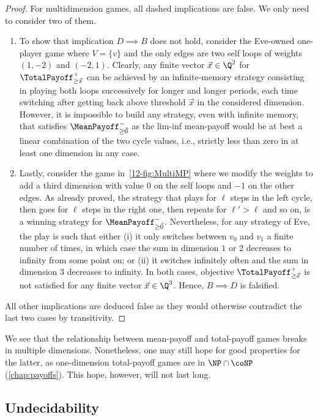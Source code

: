 \begin{proof}
For multidimension games, all dashed implications are false. We only need to consider two of them.
\begin{enumerate}
\item\label{12-lem:MPTP_proof1} To show that implication $D \implies B$ does not hold, consider the Eve-owned one-player game where $V = \{v\}$ and the only edges are two self loops of weights $(1, -2)$ and $(-2, 1)$. Clearly, any finite vector $\vec{x} \in \Q^{2}$ for $\TotalPayoff^{+}_{\geq \vec{x}}$ can be achieved by an infinite-memory strategy consisting in playing both loops successively for longer and longer periods, each time switching after getting back above threshold $\vec{x}$ in the considered dimension. However, it is impossible to build any strategy, even with infinite memory, that satisfies $\MeanPayoff^{-}_{\geq \vec{0}}$ as the lim-inf mean-payoff would be at best a linear combination of the two cycle values, i.e., strictly less than zero in at least one dimension in any case.
\item Lastly, consider the game in~\cref{12-fig:MultiMP} where we modify the weights to add a third dimension with value $0$ on the self loops and $-1$ on the other edges. As already proved, the strategy that plays for $\ell$ steps in the left cycle, then goes for $\ell$ steps in the right one, then repeats for $\ell' > \ell$ and so on, is a winning strategy for $\MeanPayoff^{-}_{\geq \vec{0}}$. Nevertheless, for any strategy of Eve, the play is such that either (i) it only switches between $v_0$ and $v_1$ a finite number of times, in which case the sum in dimension $1$ or $2$ decreases to infinity from some point on; or (ii) it switches infinitely often and the sum in dimension $3$ decreases to infinity. In both cases, objective $\TotalPayoff^{+}_{\geq \vec{x}}$ is not satisfied for any finite vector $\vec{x} \in  \Q^{3}$. Hence, $B \implies D$ is falsified.
\end{enumerate}
All other implications are deduced false as they would otherwise contradict the last two cases by transitivity.
\end{proof}

We see that the relationship between mean-payoff and total-payoff games breaks in multiple dimensions. Nonetheless, one may still hope for good properties for the latter, as one-dimension total-payoff games are in $\NP \cap \coNP$ (\cref{chap:payoffs}).  This hope, however, will not last long.

\subsection{Undecidability}

